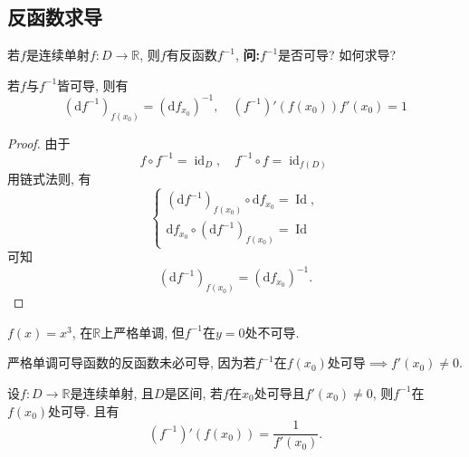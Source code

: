 \subsection{反函数求导}
若$f$是连续单射$f\colon D\to \mathbb{R}$, 则$f$有反函数$f^{-1}$, \textbf{问:}$f^{-1}$是否可导? 如何求导?

\begin{proposition}
    若$f$与$f^{-1}$皆可导, 则有
    \begin{equation}
      \left( \mathrm{d} f^{-1} \right) _{f\left( x_0 \right) } = \left( \mathrm{d} f_{x_0} \right) ^{-1}, \quad \left( f^{-1} \right) ' \left( f\left( x_0 \right)  \right) f'\left( x_0 \right) = 1
    \end{equation}
\end{proposition}
\begin{proof}
    由于
    \begin{equation}
      f \circ f^{-1} = \operatorname{id} _{D} ,\quad f^{-1} \circ f = \operatorname{id}_{f(D)}
    \end{equation}
    用链式法则, 有
    \begin{equation}
        \begin{cases}
          \left( \mathrm{d} f^{-1} \right) _{f\left( x_0 \right) } \circ \mathrm{d} f_{x_0} = \operatorname{Id},
          \\
          \mathrm{d} f_{x_0} \circ \left( \mathrm{d} f^{-1} \right) _{f\left( x_0 \right) } = \operatorname{Id}
        \end{cases}
    \end{equation}
    可知
    \begin{equation}
      \left( \mathrm{d} f^{-1} \right) _{f\left( x_0 \right) } = \left( \mathrm{d} f_{x_0} \right) ^{-1}.
    \end{equation}
\end{proof}

\begin{example}
    $f\left( x \right) = x^{3}$, 在$\mathbb{R}$上严格单调, 但$f^{-1}$在$y = 0$处不可导.

    严格单调可导函数的反函数未必可导, 因为若$f^{-1}$在$f\left( x_0 \right) $处可导$\implies f'\left( x_0 \right) \neq 0$.
\end{example}

\begin{theorem}
    设$f\colon D\to \mathbb{R}$是连续单射, 且$D$是区间, 若$f$在$x_0$处可导且$f'\left( x_0 \right) \neq 0$, 则$f^{-1}$在$f\left( x_0 \right) $处可导. 且有
    \begin{equation}
      \left( f^{-1} \right) ' \left( f\left( x_0 \right)  \right)  = \frac{1}{f'\left( x_0 \right) }.
    \end{equation} 
\end{theorem}

